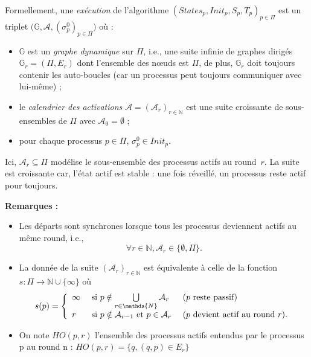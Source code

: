 \documentclass{article}
\begin{document}
Formellement, une \emph{ex\'ecution} de l'algorithme  $(States_p, Init_p, S_p,T_p)_{p\in \Pi}$ est 
	un triplet $\big( \mathds{G} ,  \mathcal{A} , (\sigma^0_p)_{p \in \Pi} \big)$ où :
	\begin{itemize}
		\item $\mathds{G}$ est un \emph{graphe dynamique} sur $\Pi$, i.e., une suite infinie de graphes dirig\'es 
			$\mathds{G}_r = (\Pi, E_r)$ dont l'ensemble des n\oe uds est $\Pi$, 
			de plus, $\mathds{G}_r$ doit toujours contenir les auto-boucles (car un processus peut toujours communiquer avec lui-même) ; 
		\item le \emph{calendrier des activations} $\mathcal{A} = (\mathcal{A}_r)_{r \in \mathds{N}}$ est une suite 
			croissante de sous-ensembles de $\Pi$ 
			avec $\mathcal{A}_0 = \emptyset$ ;
		\item pour chaque processus $p\in \Pi$, $\sigma^0_p \in Init_p$.
	\end{itemize}
Ici,  $\mathcal{A}_r \subseteq \Pi$ modélise le sous-ensemble des processus actifs au round~$r$.
La suite est croissante car, l'état actif est stable : une fois r\'eveill\'e, un processus reste actif pour toujours.

\textbf{Remarques :}
\begin{itemize}
	\item Les départs sont synchrones lorsque tous les processus deviennent actifs au même round, i.e.,
	$$ \forall r \in \mathds{N}, \mathcal{A}_r \in \{\emptyset, \Pi\}  . $$
	\item La donn\'ee de la suite $(\mathcal{A}_r)_{r \in \mathds{N}}$ est  équivalente \`a celle de la fonction 
	$s : \Pi \rightarrow \mathds{N} \cup \{\infty\}$ où 
	$$ s(p) = \left \{ \begin{array}{l ll}
	                          \infty & \mbox{ si  } p \notin \bigcup\limits_{r \in \mathds{N}}  \mathcal{A}_r &  \mbox { ($p$ reste passif) } \\
	                          r  & \mbox{ si  } p \notin \mathcal{A}_{r-1} \mbox{ et } p \in \mathcal{A}_{r}  & \mbox{ ($p$ devient actif au round $r$)}.
	                          \end{array} \right.$$ 
	\item On note $HO(p,r)$ l'ensemble des processus actifs entendus par le processus p au round n : $HO(p,r) = \{q, (q,p) \in E_r\}$

\end{itemize}
\end{document}
